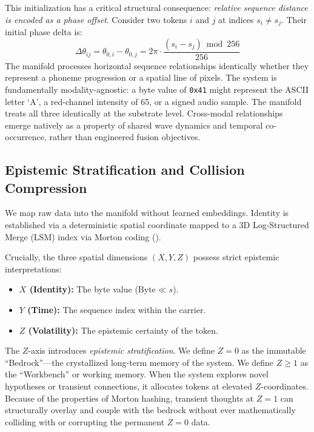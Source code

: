 \documentclass[11pt,a4paper]{article}
\begin{document}
This initialization has a critical structural consequence: \emph{relative sequence distance is encoded as a phase offset}. Consider two tokens $i$ and $j$ at indices $s_i \neq s_j$. Their initial phase delta is:
\begin{equation}
\Delta\theta_{ij} = \theta_{0,i} - \theta_{0,j} = 2\pi \cdot \frac{(s_i - s_j) \bmod 256}{256}
\label{eq:beat_frequency}
\end{equation}
The manifold processes horizontal sequence relationships identically whether they represent a phoneme progression or a spatial line of pixels. The system is fundamentally modality-agnostic: a byte value of \texttt{0x41} might represent the ASCII letter `A', a red-channel intensity of 65, or a signed audio sample. The manifold treats all three identically at the substrate level. Cross-modal relationships emerge natively as a property of shared wave dynamics and temporal co-occurrence, rather than engineered fusion objectives.

\subsection{Epistemic Stratification and Collision Compression}
\label{sec:collision_is_compression}
\label{sec:lsm_compression}

We map raw data into the manifold without learned embeddings. Identity is established via a deterministic spatial coordinate mapped to a 3D Log-Structured Merge (LSM) index via Morton coding (). 

Crucially, the three spatial dimensions $(X, Y, Z)$ possess strict epistemic interpretations:
\begin{itemize}[nosep]
  \item \textbf{$X$ (Identity):} The byte value ($\text{Byte} \ll s$).
  \item \textbf{$Y$ (Time):} The sequence index within the carrier.
  \item \textbf{$Z$ (Volatility):} The epistemic certainty of the token. 
\end{itemize}

The $Z$-axis introduces \emph{epistemic stratification}. We define $Z=0$ as the immutable ``Bedrock''---the crystallized long-term memory of the system. We define $Z \ge 1$ as the ``Workbench'' or working memory. When the system explores novel hypotheses or transient connections, it allocates tokens at elevated $Z$-coordinates. Because of the properties of Morton hashing, transient thoughts at $Z=1$ can structurally overlay and couple with the bedrock without ever mathematically colliding with or corrupting the permanent $Z=0$ data.
\end{document}

